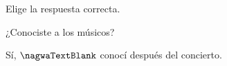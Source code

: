 
\begin{question}

\begin{instance}
  
\begin{mcq}[standalone=false]
    
\begin{stem}
      Elige la respuesta correcta.\par      
\begin{enumerationnolabel}
        \item{¿Conociste a los músicos?}        \item{Sí, $\nagwaTextBlank$ conocí después del concierto.}      
\end{enumerationnolabel}
    
\end{stem}
    
\begin{distractors}
\end{distractors}
              
\end{mcq}

\end{instance}

\end{question}
